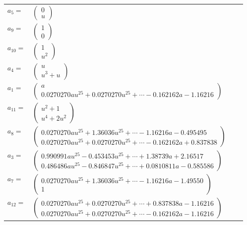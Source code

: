 \documentclass[1p]{elsarticle_modified}
\theoremstyle{definition}
\begin{document}
\begin{tabular}{m{7pt} m{180pt} m{7pt} m{180pt} }
\flushright $a_{5}=$&$\begin{pmatrix}0\\u\end{pmatrix}$ \\
\flushright $a_{9}=$&$\begin{pmatrix}1\\0\end{pmatrix}$ \\
\flushright $a_{10}=$&$\begin{pmatrix}1\\u^2\end{pmatrix}$ \\
\flushright $a_{4}=$&$\begin{pmatrix}u\\u^3+u\end{pmatrix}$ \\
\flushright $a_{1}=$&$\begin{pmatrix}a\\0.0270270 a u^{25}+0.0270270 u^{25}+\cdots-0.162162 a-1.16216\end{pmatrix}$ \\
\flushright $a_{11}=$&$\begin{pmatrix}u^2+1\\u^4+2 u^2\end{pmatrix}$ \\
\flushright $a_{8}=$&$\begin{pmatrix}0.0270270 a u^{25}+1.36036 u^{25}+\cdots-1.16216 a-0.495495\\0.0270270 a u^{25}+0.0270270 u^{25}+\cdots-0.162162 a+0.837838\end{pmatrix}$ \\
\flushright $a_{3}=$&$\begin{pmatrix}0.990991 a u^{25}-0.453453 u^{25}+\cdots+1.38739 a+2.16517\\0.486486 a u^{25}-0.846847 u^{25}+\cdots+0.0810811 a-0.585586\end{pmatrix}$ \\
\flushright $a_{7}=$&$\begin{pmatrix}0.0270270 a u^{25}+1.36036 u^{25}+\cdots-1.16216 a-1.49550\\1\end{pmatrix}$ \\
\flushright $a_{12}=$&$\begin{pmatrix}0.0270270 a u^{25}+0.0270270 u^{25}+\cdots+0.837838 a-1.16216\\0.0270270 a u^{25}+0.0270270 u^{25}+\cdots-0.162162 a-1.16216\end{pmatrix}$ \\

\end{tabular}
\end{document}
